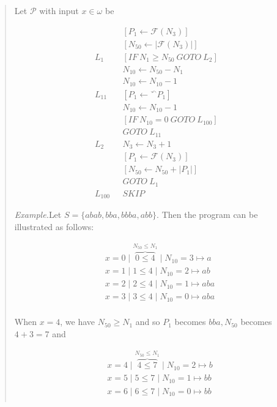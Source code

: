 \documentclass[a4paper, 12pt]{article}
\begin{document}
\begin{quote}
Let $\mathcal{P}$
with input $x \in \omega$ be 

\begin{align*}
    &[P_1 \leftarrow \mathcal{F}(N_3)] \\ 
    &[N_{50} \leftarrow  |\mathcal{F}(N_3)|] \\
    L_1 ~ ~ ~ &[IF ~ N_1 \geq N_{50} ~ GOTO ~ L_2] \\ 
              & N_{10} \leftarrow N_{50} - N_1\\
              & N_{10} \leftarrow N_{10} - 1\\
    L_{11} ~ ~ ~ & [P_1 \leftarrow {}^{\curvearrowleft} P_1]\\ 
              & N_{10} \leftarrow  N_{10} - 1 \\ 
              & [IF ~ N_{10} = 0 ~ GOTO ~ L_{100} ]\\ 
              &GOTO ~ L_{11}\\
    L_2 ~ ~ ~ &N_3 \leftarrow N_3 + 1 \\ 
    &[P_1 \leftarrow \mathcal{F}(N_3)] \\ 
              &[N_{50} \leftarrow N_{50} + |P_1|] \\ 
              &GOTO ~ L_1\\
    L_{100} ~ ~ ~ &SKIP
\end{align*}

\footnotesize
\textit{Example.}Let $S = \{ abab, bba, bbba, abb\}$. Then the program can be
illustrated as follows:

\begin{align*}
    &x = 0 \mid  \overbrace{0 \leq 4}^{N_{50} \leq N_1} \mid N_{10} = 3 \mapsto a \\
    &x = 1 \mid 1 \leq 4 \mid N_{10} = 2 \mapsto ab \\
    &x = 2 \mid  2 \leq 4 \mid N_{10} = 1 \mapsto aba \\
    &x = 3 \mid   3 \leq 4 \mid N_{10} = 0 \mapsto aba \\
\end{align*}

When $x = 4$, we have $N_{50} \geq N_1$ and so $P_1$ becomes $bba, N_{50}$
becomes $4 + 3 = 7$ and

\begin{align*}
    &x = 4 \mid  \overbrace{4 \leq 7}^{N_{50} \leq N_1} \mid N_{10} = 2  \mapsto
    b\\
    &x = 5 \mid  5 \leq 7 \mid N_{10} = 1  \mapsto
    bb\\
    &x = 6 \mid  6 \leq 7 \mid N_{10} = 0  \mapsto
    bb\\
\end{align*}


\end{quote}
\end{document}
